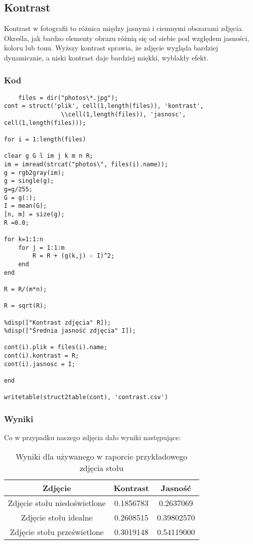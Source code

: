 \documentclass[]{mwart}
\begin{document}
\newpage



\newpage
\subsection{Kontrast}
Kontrast w fotografii to różnica między jasnymi i ciemnymi obszarami zdjęcia.
Określa, jak bardzo elementy obrazu różnią się od siebie pod względem
jasności, koloru lub tonu. Wyższy kontrast sprawia, że zdjęcie wygląda
bardziej dynamicznie, a niski kontrast daje bardziej miękki, wyblakły
efekt.

\subsubsection{Kod}
\begin{verbatim}
    files = dir("photos\*.jpg");
cont = struct('plik', cell(1,length(files)), 'kontrast',
                \\cell(1,length(files)), 'jasnosc', cell(1,length(files)));

for i = 1:length(files)

clear g G l im j k m n R;
im = imread(strcat("photos\", files(i).name)); 
g = rgb2gray(im);
g = single(g);
g=g/255;
G = g(:);
I = mean(G);
[n, m] = size(g);
R =0.0;

for k=1:1:n
    for j = 1:1:m
        R = R + (g(k,j) - I)^2;
    end
end

R = R/(m*n);

R = sqrt(R);

%disp(["Kontrast zdjęcia" R]);
%disp(["Średnia jasność zdjęcia" I]);

cont(i).plik = files(i).name;
cont(i).kontrast = R;
cont(i).jasnosc = I;

end

writetable(struct2table(cont), 'contrast.csv')

\end{verbatim}
\subsubsection{Wyniki}
Co w przypadku naszego zdjęcia dało wyniki następujące:

\begin{table}[h]
    \centering
    \begin{tabular}{|c|c|c|}
        \hline
        Zdjęcie                      & Kontrast  & Jasność    \\ \hline
        Zdjęcie stołu niedoświetlone & 0.1856783 & 0.2637069  \\ \hline
        Zdjęcie stołu idealne        & 0.2608515 & 0.39802570 \\ \hline
        Zdjęcie stołu prześwietlone  & 0.3019148 & 0.54119000 \\ \hline
    \end{tabular}
    \caption{Wyniki dla używanego w raporcie przykładowego zdjęcia stołu}
\end{table}
\end{document}
